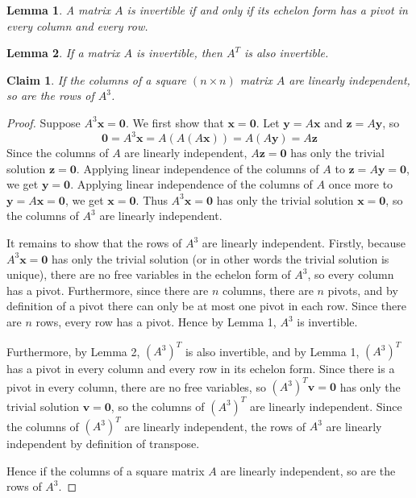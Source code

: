 \documentclass{article}
\newtheorem*{claim}{Claim}
\newtheorem{lemma}{Lemma}
\begin{document}
\begin{lemma}
    A matrix $A$ is invertible if and only if its echelon form has a pivot in every column and every row.
\end{lemma}

\begin{lemma}
    If a matrix $A$ is invertible, then $A^T$ is also invertible.
\end{lemma}

\begin{claim}
    If the columns of a square $(n \times n)$ matrix $A$ are linearly independent, so are the rows of $A^3$.
\end{claim}

\begin{proof}
    Suppose $A^3\mathbf{x} = \mathbf{0}$. We first show that $\mathbf{x} = \mathbf{0}$. Let 
    $\mathbf{y} = A\mathbf{x}$ and $\mathbf{z} = A\mathbf{y}$, so 
    \[
    \mathbf{0} = A^3\mathbf{x} = A(A(A\mathbf{x})) = A(A\mathbf{y}) = A\mathbf{z}
    \]
    Since the columns of $A$ are linearly independent, $A\mathbf{z} = \mathbf{0}$ has only the trivial solution 
    $\mathbf{z} = \mathbf{0}$. Applying linear independence of the columns of $A$ to 
    $\mathbf{z} = A\mathbf{y} = \mathbf{0}$, we get $\mathbf{y} = \mathbf{0}$. Applying linear independence of 
    the columns of $A$ once more to $\mathbf{y} = A\mathbf{x} = \mathbf{0}$, we get $\mathbf{x} = \mathbf{0}$.
    Thus $A^3\mathbf{x} = \mathbf{0}$ has only the trivial solution $\mathbf{x} = \mathbf{0}$, so the columns of 
    $A^3$ are linearly independent.

    \medskip

    It remains to show that the rows of $A^3$ are linearly independent. Firstly, because 
    $A^3\mathbf{x} = \mathbf{0}$ has only the trivial solution (or in other words the trivial solution is unique), 
    there are no free variables in the echelon form of $A^3$, so every column has a pivot. Furthermore, since there 
    are $n$ columns, there are $n$ pivots, and by definition of a pivot there can only be at most one pivot in each 
    row. Since there are $n$ rows, every row has a pivot. Hence by Lemma 1, $A^3$ is invertible.

    \medskip

    Furthermore, by Lemma 2, $(A^3)^T$ is also invertible, and by Lemma 1, $(A^3)^T$ has a pivot in every column 
    and every row in its echelon form. Since there is a pivot in every column, there are no free variables, so 
    $(A^3)^T\mathbf{v} = \mathbf{0}$ has only the trivial solution $\mathbf{v} = \mathbf{0}$, so the columns of 
    $(A^3)^T$ are linearly independent. Since the columns of $(A^3)^T$ are linearly independent, the rows of 
    $A^3$ are linearly independent by definition of transpose.

    \medskip

    Hence if the columns of a square matrix $A$ are linearly independent, so are the rows of $A^3$.
\end{proof}
\end{document}
